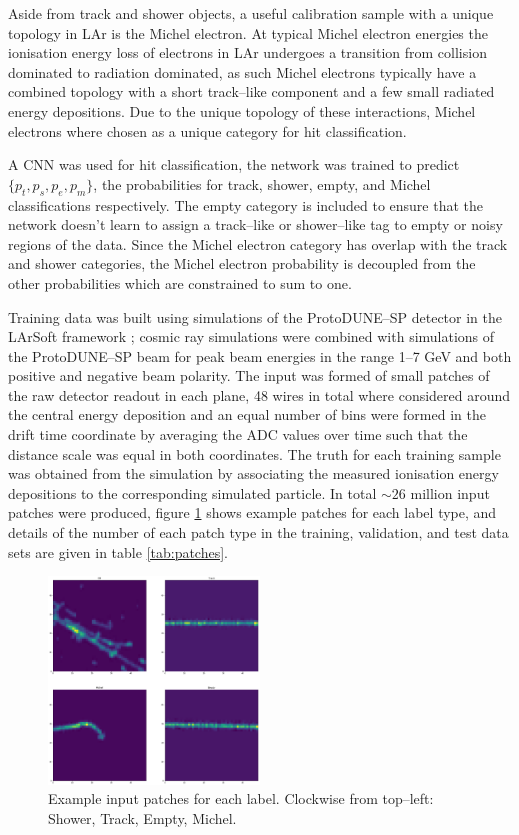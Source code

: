 Aside from track and shower objects, a useful calibration sample with a unique
topology in LAr is the Michel electron. At typical Michel electron energies the
ionisation energy loss of electrons in LAr undergoes a transition from collision
dominated to radiation dominated, as such Michel electrons typically have a
combined topology with a short track--like component and a few small radiated
energy depositions. Due to the unique topology of these interactions, Michel
electrons where chosen as a unique category for hit classification. 

A CNN was used for hit classification, the network was trained to predict
\(\{p_t, p_s, p_e, p_m\}\), the probabilities for track, shower, empty, and
Michel classifications respectively. The empty category is included to ensure
that the network doesn't learn to assign a track--like or shower--like tag to
empty or noisy regions of the data. Since the Michel electron category has
overlap with the track and shower categories, the Michel electron probability is
decoupled from the other probabilities which are constrained to sum to one.

Training data was built using simulations of the ProtoDUNE--SP detector in the
LArSoft framework \cite{Snider2017}; cosmic ray simulations were combined with
simulations of the ProtoDUNE--SP beam for peak beam energies in the range 1--7
GeV and both positive and negative beam polarity. The input was formed of small
patches of the raw detector readout in each plane, 48 wires in total where
considered around the central energy deposition and an equal number of bins were
formed in the drift time coordinate by averaging the ADC values over time such
that the distance scale was equal in both coordinates. The truth for each
training sample was obtained from the simulation by associating the measured
ionisation energy depositions to the corresponding simulated particle. In total
\(\sim26\) million input patches were produced, figure \ref{fig:patches} shows
example patches for each label type, and details of the number of each patch
type in the training, validation, and test data sets are given in table
\ref{tab:patches}. 

\begin{figure}[h]
	\centering
	\includegraphics[width=0.5\textwidth]{figures/patch_examples.pdf}  
	\caption[Example CNN input images.]{Example input patches for
	each label. Clockwise from top--left: Shower, Track, Empty, Michel.}
	\label{fig:patches}
\end{figure}

